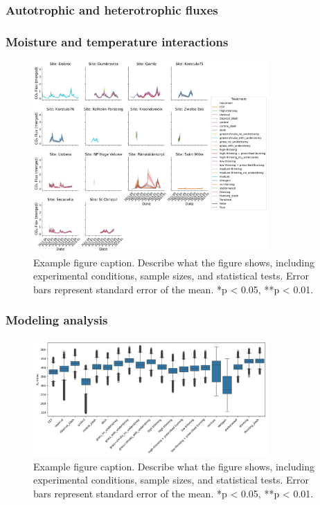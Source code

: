 \documentclass[12pt,a4paper]{article}
\begin{document}
\subsubsection{Autotrophic and heterotrophic fluxes}

\subsubsection{Moisture and temperature interactions}
\begin{figure}[H]
    \centering
    \includegraphics[width=0.8\textwidth]{"../co2_flux_timeseries.png"}
    \caption{Example figure caption. Describe what the figure shows, including experimental conditions, sample sizes, and statistical tests. Error bars represent standard error of the mean. *p < 0.05, **p < 0.01.}
    \label{fig:timeseries}
\end{figure}




\subsubsection{Modeling analysis}

\begin{figure}[H]
    \centering
    \includegraphics[width=0.8\textwidth]{"../ea_boxplot.png"}
    \caption{Example figure caption. Describe what the figure shows, including experimental conditions, sample sizes, and statistical tests. Error bars represent standard error of the mean. *p < 0.05, **p < 0.01.}
    \label{fig:ea_boxplot}
\end{figure}
\end{document}
